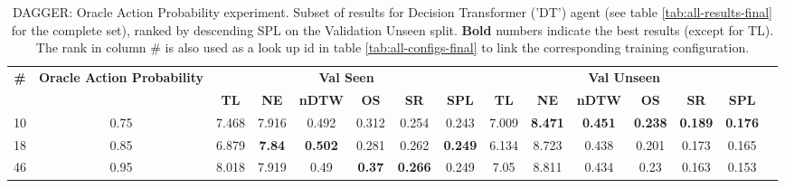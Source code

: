 \begin{table}
\centering
\caption{\label{tab:dt_dagger_prob}DAGGER: Oracle Action Probability experiment. Subset of results for Decision Transformer ('DT') agent (see table \ref{tab:all-results-final} for the complete set), ranked by descending SPL on the Validation Unseen split. \textbf{Bold} numbers indicate the best results (except for TL). The rank in column \# is also used as a look up id in table \ref{tab:all-configs-final} to link the corresponding training configuration.}
\begin{tabular}{@{\hskip3pt}c@{\hskip3pt}c@{\hskip3pt}c@{\hskip3pt}c@{\hskip3pt}c@{\hskip3pt}c@{\hskip3pt}c@{\hskip3pt}c@{\hskip3pt}c@{\hskip3pt}c@{\hskip3pt}c@{\hskip3pt}c@{\hskip3pt}c@{\hskip3pt}c@{\hskip3pt}c}
\toprule
                                  \textbf{\#} & \textbf{Oracle Action Probability} & \multicolumn{6}{c}{\textbf{Val Seen}} & \multicolumn{6}{c}{\textbf{Val Unseen}} \\
\cmidrule(l){3-8}\cmidrule(l){9-14}\textbf{~} &                         \textbf{~} &       \textbf{TL} &    \textbf{NE} &   \textbf{nDTW} &    \textbf{OS} &     \textbf{SR} &    \textbf{SPL} &         \textbf{TL} &     \textbf{NE} &   \textbf{nDTW} &     \textbf{OS} &     \textbf{SR} &    \textbf{SPL} \\
\midrule
                                           10 &                               0.75 &             7.468 &          7.916 &           0.492 &          0.312 &           0.254 &           0.243 &               7.009 &  \textbf{8.471} &  \textbf{0.451} &  \textbf{0.238} &  \textbf{0.189} &  \textbf{0.176} \\
                                           18 &                               0.85 &             6.879 &  \textbf{7.84} &  \textbf{0.502} &          0.281 &           0.262 &  \textbf{0.249} &               6.134 &           8.723 &           0.438 &           0.201 &           0.173 &           0.165 \\
                                           46 &                               0.95 &             8.018 &          7.919 &            0.49 &  \textbf{0.37} &  \textbf{0.266} &           0.249 &                7.05 &           8.811 &           0.434 &            0.23 &           0.163 &           0.153 \\
\bottomrule
\end{tabular}
\end{table}

